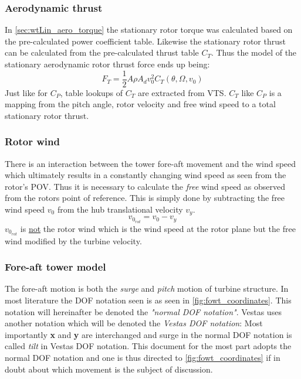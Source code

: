 \subsubsection{Aerodynamic thrust} \label{sec:wtLin_aero_thrust}
In \cref{sec:wtLin_aero_torque} the stationary rotor torque was calculated based on the pre-calculated power coefficient table. Likewise the stationary rotor thrust can be calculated from the pre-calculated thrust table $ C_T $. Thus the model of the stationary aerodynamic rotor thrust force ends up being:
\begin{equation} \label{eq:wtLin_aero_thrust}
	F_T = \dfrac{1}{2} A \rho A_d v_0^2 C_T(\theta, \Omega, v_0)
\end{equation}
Just like for $ C_P $, table lookups of $ C_T $ are extracted from VTS. $ C_T $ like $ C_P $ is a mapping from the pitch angle, rotor velocity and free wind speed to a total stationary rotor thrust.


\subsubsection{Rotor wind}
There is an interaction between the tower fore-aft movement and the wind speed which ultimately results in a constantly changing wind speed as seen from the rotor's POV. Thus it is necessary to calculate the \textit{free} wind speed as observed from the rotors point of reference. This is simply done by subtracting the free wind speed $ v_0 $ from the hub translational velocity $ v_y $.
\begin{equation}\label{eq:wtlin_comp_rotorwind}
	v_{0_{rot}} = v_{0} - v_y
\end{equation}
$ v_{0_{rot}} $ is \underline{not} the rotor wind which is the wind speed at the rotor plane but the free wind modified by the turbine velocity.


\subsubsection{Fore-aft tower model}
The fore-aft motion is both the \textit{surge} and \textit{pitch} motion of turbine structure. In most literature the DOF notation seen is as seen in \cref{fig:fowt_coordinates}. This notation will hereinafter be denoted the \textit{"normal DOF notation"}. Vestas uses another notation which will be denoted the \textit{Vestas DOF notation}: Most importantly \textbf{x} and \textbf{y} are interchanged and surge in the normal DOF notation is called \textit{tilt} in Vestas DOF notation. This document for the most part adopts the normal DOF notation and one is thus directed to \cref{fig:fowt_coordinates} if in doubt about which movement is the subject of discussion.

